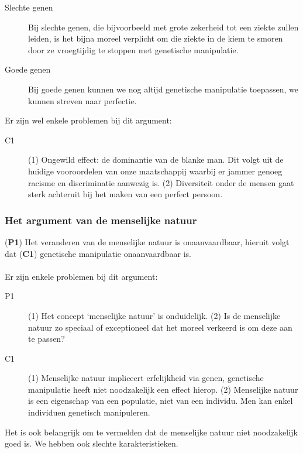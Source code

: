 \documentclass[../summary.tex]{subfiles}
\begin{document}
				\begin{description}
					\item[Slechte genen] Bij slechte genen, die bijvoorbeeld met grote zekerheid tot een ziekte zullen leiden, is het bijna moreel verplicht om die ziekte in de kiem te smoren door ze vroegtijdig te stoppen met genetische manipulatie. 
					\item[Goede genen] Bij goede genen kunnen we nog altijd genetische manipulatie toepassen, we kunnen streven naar perfectie. 
				\end{description}
				Er zijn wel enkele problemen bij dit argument:
				\begin{description}
					\item[C1] (1) Ongewild effect: de dominantie van de blanke man. Dit volgt uit de huidige vooroordelen van onze maatschappij waarbij er jammer genoeg racisme en discriminatie aanwezig is. (2) Diversiteit onder de mensen gaat sterk achteruit bij het maken van een perfect persoon. 
				\end{description}
			
			\subsubsection{Het argument van de menselijke natuur}
				(\textbf{P1}) Het veranderen van de menselijke natuur is onaanvaardbaar, hieruit volgt dat (\textbf{C1}) genetische manipulatie onaanvaardbaar is. \\
				\\
				Er zijn enkele problemen bij dit argument:
				\begin{description}
					\item[P1] (1) Het concept `menselijke natuur' is onduidelijk. (2) Is de menselijke natuur zo speciaal of exceptioneel dat het moreel verkeerd is om deze aan te passen?
					\item[C1] (1) Menselijke natuur impliceert erfelijkheid via genen, genetische manipulatie heeft niet noodzakelijk een effect hierop. (2) Menselijke natuur is een eigenschap van een populatie, niet van een individu. Men kan enkel individuen genetisch manipuleren. 
 				\end{description}
 				Het is ook belangrijk om te vermelden dat de menselijke natuur niet noodzakelijk goed is. We hebben ook slechte karakteristieken.
 		
 		\newpage
\end{document}
